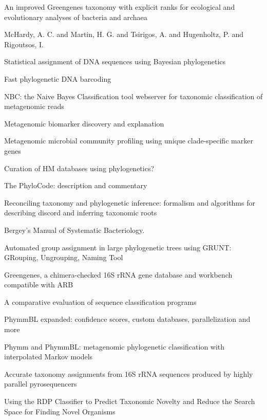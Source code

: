 \documentclass{amsart}
\begin{document}
\cite{mcdonald2011improved}
An improved Greengenes taxonomy with explicit ranks for ecological and evolutionary analyses of bacteria and archaea

\cite{phylopythia}
McHardy, A. C.  and Martin, H. G.  and Tsirigos, A.  and Hugenholtz, P.  and Rigoutsos, I.

\cite{munch2008statistical}
Statistical assignment of DNA sequences using Bayesian phylogenetics

\cite{munch2008fast}
Fast phylogenetic DNA barcoding

\cite{rosen2011nbc}
NBC: the Naive Bayes Classification tool webserver for taxonomic classification of metagenomic reads


\cite{segata2011metagenomic}
Metagenomic biomarker discovery and explanation

\cite{segata2012metagenomic}
Metagenomic microbial community profiling using unique clade-specific marker genes



Curation of HM databases using phylogenetics?

\cite{forey2001phylocode}
{The PhyloCode: description and commentary}

\cite{matsen2011reconciling}
Reconciling taxonomy and phylogenetic inference: formalism and algorithms for describing discord and inferring taxonomic roots

\cite{carma}


\cite{kreig1984bergey}
Bergey's Manual of Systematic Bacteriology.

\cite{dalevi2007automated}
Automated group assignment in large phylogenetic trees using GRUNT: GRouping, Ungrouping, Naming Tool

\cite{desantis2006greengenes}
{Greengenes, a chimera-checked 16S rRNA gene database and workbench compatible with ARB}

\cite{bazinet2012comparative}
A comparative evaluation of sequence classification programs

\cite{brady2011phymmbl}
PhymmBL expanded: confidence scores, custom databases, parallelization and more

\cite{brady2009phymm}
Phymm and PhymmBL: metagenomic phylogenetic classification with interpolated Markov models

\cite{ColeEaRDP2009}

\cite{liu2008accurate}
Accurate taxonomy assignments from 16S rRNA sequences produced by highly parallel pyrosequencers

\cite{lan2012using}
Using the RDP Classifier to Predict Taxonomic Novelty and Reduce the Search Space for Finding Novel Organisms
\end{document}
